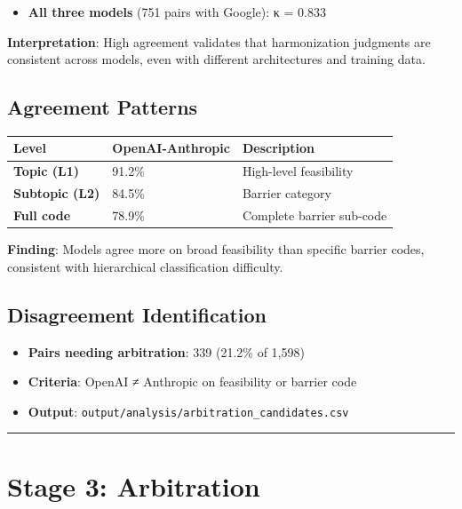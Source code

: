 \documentclass[
  letterpaper,
]{report}
\providecommand{\tightlist}{%
  \setlength{\itemsep}{0pt}\setlength{\parskip}{0pt}}
\begin{document}
\begin{itemize}
\tightlist
\item
  \textbf{All three models} (751 pairs with Google): κ = 0.833
\end{itemize}

\textbf{Interpretation}: High agreement validates that harmonization
judgments are consistent across models, even with different
architectures and training data.

\subsection{Agreement Patterns}\label{agreement-patterns}

\begin{longtable}[]{@{}lll@{}}
\toprule\noalign{}
Level & OpenAI-Anthropic & Description \\
\midrule\noalign{}
\endhead
\bottomrule\noalign{}
\endlastfoot
\textbf{Topic (L1)} & 91.2\% & High-level feasibility \\
\textbf{Subtopic (L2)} & 84.5\% & Barrier category \\
\textbf{Full code} & 78.9\% & Complete barrier sub-code \\
\end{longtable}

\textbf{Finding}: Models agree more on broad feasibility than specific
barrier codes, consistent with hierarchical classification difficulty.

\subsection{Disagreement
Identification}\label{disagreement-identification}

\begin{itemize}
\tightlist
\item
  \textbf{Pairs needing arbitration}: 339 (21.2\% of 1,598)
\item
  \textbf{Criteria}: OpenAI ≠ Anthropic on feasibility or barrier code
\item
  \textbf{Output}: \texttt{output/analysis/arbitration\_candidates.csv}
\end{itemize}

\begin{center}\rule{0.5\linewidth}{0.5pt}\end{center}

\section{Stage 3: Arbitration}\label{stage-3-arbitration}
\end{document}
